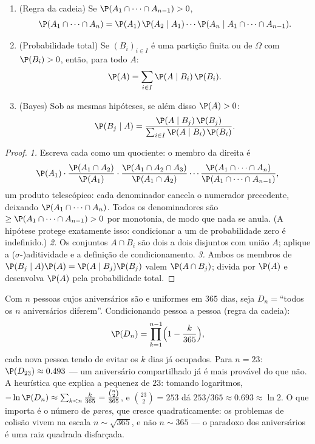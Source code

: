 \begin{theorem}\label{thm:b2:proba:bayes}
\leavevmode
\begin{enumerate}
\item (Regra da cadeia) Se $\P(A_1 \cap \dots \cap A_{n-1}) > 0$,
\[
\P(A_1 \cap \dots \cap A_n)
= \P(A_1)\,\P(A_2 \mid A_1)\cdots
\P(A_n \mid A_1 \cap \dots \cap A_{n-1}) .
\]
\item (Probabilidade total) Se $(B_i)_{i \in I}$ é uma partição finita ou
 de $\Omega$ com $\P(B_i) > 0$, então, para todo
 $A$:
\[
\P(A) = \sum_{i \in I} \P(A \mid B_i)\,\P(B_i) .
\]
\item (Bayes) Sob as mesmas hipóteses, se além disso $\P(A) > 0$:
\[
\P(B_j \mid A)
= \frac{\P(A \mid B_j)\,\P(B_j)}
       {\sum_{i \in I} \P(A \mid B_i)\,\P(B_i)} .
\]
\end{enumerate}
\end{theorem}

\begin{proof}
\emph{1.} Escreva cada  como um quociente:
o membro da direita é
\[
\P(A_1)\cdot\frac{\P(A_1 \cap A_2)}{\P(A_1)}\cdot
\frac{\P(A_1 \cap A_2 \cap A_3)}{\P(A_1 \cap A_2)}\cdots
\frac{\P(A_1 \cap \dots \cap A_n)}{\P(A_1 \cap \dots \cap
A_{n-1})},
\]
um produto telescópico: cada denominador cancela o
numerador precedente, deixando $\P(A_1 \cap \dots \cap A_n)$.
Todos os denominadores são $\geq \P(A_1 \cap \dots \cap A_{n-1}) >
0$ por monotonia, de modo que nada se anula. (A hipótese
protege exatamente isso: condicionar a um  de probabilidade
zero é indefinido.)
\emph{2.} Os conjuntos $A \cap B_i$ são dois a dois disjuntos com união
$A$; aplique a ($\sigma$-)aditividade e a definição de
condicionamento.
\emph{3.} Ambos os membros de $\P(B_j \mid A)\P(A) = \P(A \mid
B_j)\P(B_j)$ valem $\P(A \cap B_j)$; divida por $\P(A)$ e desenvolva
$\P(A)$ pela probabilidade total.
\end{proof}

\begin{example}\label{ex:b2:proba:birthday}
Com $n$ pessoas cujos aniversários são  e uniformes
em $365$ dias, seja $D_n = {}$``todos os $n$ aniversários diferem''.
Condicionando pessoa a pessoa (regra da cadeia):
\[
\P(D_n) = \prod_{k=1}^{n-1}\Bigl(1 - \frac{k}{365}\Bigr),
\]
cada nova pessoa tendo de evitar os $k$ dias já ocupados.
Para $n = 23$: $\P(D_{23}) \approx 0.493$ --- um aniversário
compartilhado já é mais provável do que não. A heurística que
explica a pequenez de $23$: tomando logaritmos, $-\ln
\P(D_n) \approx \sum_{k<n}\frac k{365} =
\frac{\binom n2}{365}$, e $\binom{23}2 = 253$ dá
$253/365 \approx 0.693 \approx \ln 2$. O que importa é o
número de \emph{pares}, que cresce quadraticamente: os problemas de
colisão vivem na escala $n \sim \sqrt{365}$, e não $n \sim
365$ --- o paradoxo dos aniversários é uma raiz quadrada disfarçada.
\end{example}

